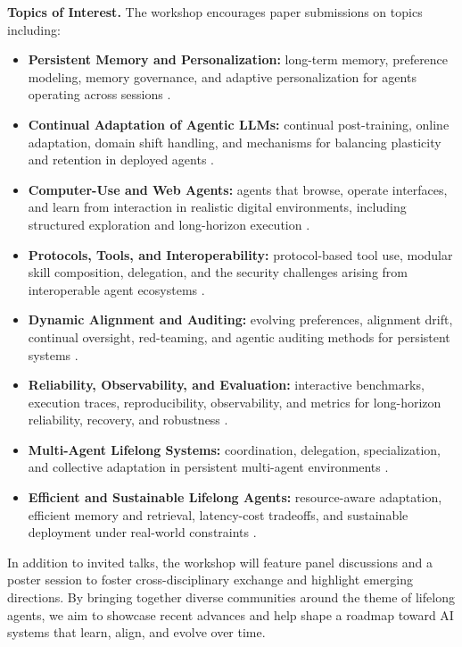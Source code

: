 \noindent\textbf{Topics of Interest.}
The workshop encourages paper submissions on topics including:
\begin{itemize}[topsep=-2pt, partopsep=0pt, leftmargin=*, itemsep=0pt]
    \item \textbf{Persistent Memory and Personalization:} long-term memory, preference modeling, memory governance, and adaptive personalization for agents operating across sessions \cite{xu2026personalized,liu2026perma}.  
    \item \textbf{Continual Adaptation of Agentic LLMs:} continual post-training, online adaptation, domain shift handling, and mechanisms for balancing plasticity and retention in deployed agents \cite{zheng2025lifelong,chen2026continual}.  
    \item \textbf{Computer-Use and Web Agents:} agents that browse, operate interfaces, and learn from interaction in realistic digital environments, including structured exploration and long-horizon execution \cite{anupam2025browserarena,gandhi2025gobrowse}.  
    \item \textbf{Protocols, Tools, and Interoperability:} protocol-based tool use, modular skill composition, delegation, and the security challenges arising from interoperable agent ecosystems \cite{yang2026mcp,prakash2026aip}.  
    \item \textbf{Dynamic Alignment and Auditing:} evolving preferences, alignment drift, continual oversight, red-teaming, and agentic auditing methods for persistent systems \cite{sheshadri2026auditbench}.  
    \item \textbf{Reliability, Observability, and Evaluation:} interactive benchmarks, execution traces, reproducibility, observability, and metrics for long-horizon reliability, recovery, and robustness \cite{ma2026maestro,anupam2025browserarena}.  
    \item \textbf{Multi-Agent Lifelong Systems:} coordination, delegation, specialization, and collective adaptation in persistent multi-agent environments \cite{ma2026maestro,prakash2026aip}.  
    \item \textbf{Efficient and Sustainable Lifelong Agents:} resource-aware adaptation, efficient memory and retrieval, latency-cost tradeoffs, and sustainable deployment under real-world constraints \cite{chen2026continual,ma2026maestro}.  
\end{itemize}

In addition to invited talks, the workshop will feature panel discussions and a poster session to foster cross-disciplinary exchange and highlight emerging directions. By bringing together diverse communities around the theme of lifelong agents, we aim to showcase recent advances and help shape a roadmap toward AI systems that learn, align, and evolve over time.

